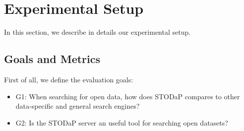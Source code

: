 \section{Experimental Setup}
\label{sec:setup}



In this section, we describe in details our experimental setup.

\subsection{Goals and Metrics} %

First of all, we define the evaluation goals:
\begin{itemize}
	\item G1: When searching for open data, how does STODaP compares to other data-specific and general search engines?
	\item G2: Is the STODaP server an useful tool for searching open datasets?
\end{itemize}

